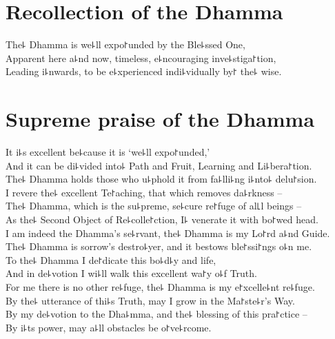 \clearpage

\chapter{Recollection of the Dhamma}%

\begin{leader}
\end{leader}

The꜕ Dhamma is we꜕ll expo꜓unded by the Ble꜕ssed One,\\
Apparent here a꜕nd now, timeless, e꜕ncouraging inve꜕stiga꜓tion,\\
Leading i꜕nwards, to be e꜕xperienced indi꜕vidually by꜓ the꜕ wise.

\chapter{Supreme praise of the Dhamma}%

\begin{leader}
\end{leader}

It i꜕s excellent be꜕cause it is `we꜕ll expo꜓unded,'\\
And it can be di꜕vided into꜕ Path and Fruit, Learning and Li꜕bera꜓tion.\\
The꜕ Dhamma holds those who u꜕phold it from fa꜕lli꜕ng i꜕nto꜕ delu꜓sion.\\
I revere the꜕ excellent Te꜓aching, that which removes da꜕rkness --\\
The꜕ Dhamma, which is the su꜕preme, se꜕cure re꜓fuge of al꜖l beings --\\
As the꜕ Second Object of Re꜕colle꜓ction, I꜕ venerate it with bo꜓wed head.\\
I am indeed the Dhamma's se꜕rvant, the꜕ Dhamma is my Lo꜓rd a꜕nd Guide.\\
The꜕ Dhamma is sorrow's destro꜕yer, and it bestows ble꜓ssi꜓ngs o꜕n me.\\
To the꜕ Dhamma I de꜓dicate this bo꜕d꜕y and life,\\
And in de꜕votion I wi꜕ll walk this excellent wa꜓y o꜕f Truth.\\
For me there is no other re꜕fuge, the꜕ Dhamma is my e꜓xcelle꜕nt re꜕fuge.\\
By the꜕ utterance of thi꜕s Truth, may I grow in the Ma꜓ste꜕r's Way.\\
By my de꜕votion to the Dha꜕mma, and the꜕ blessing of this pra꜓ctice --\\
By i꜕ts power, may a꜕ll obstacles be o꜓ve꜕rcome.

